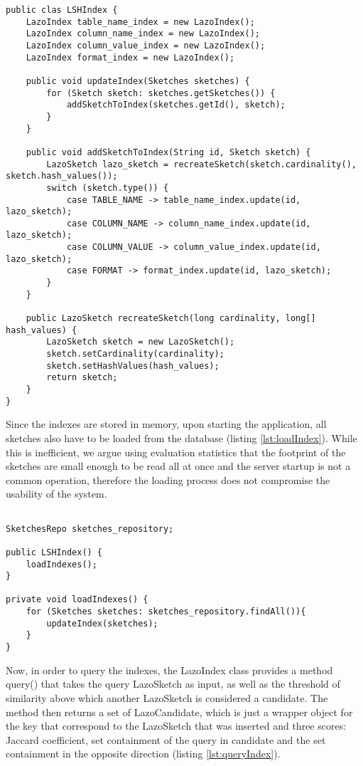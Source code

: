 \begin{lstlisting}[caption=Inserting sketches into the indexes, label=lst:updateIndex]
public clas LSHIndex {
    LazoIndex table_name_index = new LazoIndex();
    LazoIndex column_name_index = new LazoIndex();
    LazoIndex column_value_index = new LazoIndex();
    LazoIndex format_index = new LazoIndex();

    public void updateIndex(Sketches sketches) {
        for (Sketch sketch: sketches.getSketches()) {
            addSketchToIndex(sketches.getId(), sketch);
        }
    }

    public void addSketchToIndex(String id, Sketch sketch) {
        LazoSketch lazo_sketch = recreateSketch(sketch.cardinality(), sketch.hash_values());
        switch (sketch.type()) {
            case TABLE_NAME -> table_name_index.update(id, lazo_sketch);
            case COLUMN_NAME -> column_name_index.update(id, lazo_sketch);
            case COLUMN_VALUE -> column_value_index.update(id, lazo_sketch);
            case FORMAT -> format_index.update(id, lazo_sketch);
        }
    }

    public LazoSketch recreateSketch(long cardinality, long[] hash_values) {
        LazoSketch sketch = new LazoSketch();
        sketch.setCardinality(cardinality);
        sketch.setHashValues(hash_values);
        return sketch;
    }
}
\end{lstlisting}

Since the indexes are stored in memory, upon starting the application, all sketches also have to be loaded from the database (listing \ref{lst:loadIndex}). While this is inefficient, we argue using evaluation statistics that the footprint of the sketches are small enough to be read all at once and the server startup is not a common operation, therefore the loading process does not compromise the usability of the system.

\begin{lstlisting}[caption=Load all sketches into indexes during initialization, label=lst:loadIndex]

SketchesRepo sketches_repository;

public LSHIndex() {
    loadIndexes();
}

private void loadIndexes() {
    for (Sketches sketches: sketches_repository.findAll()){ 
        updateIndex(sketches);
    }
}
\end{lstlisting}

Now, in order to query the indexes, the LazoIndex class provides a method query() that takes the query LazoSketch as input, as well as the threshold of similarity above which another LazoSketch is considered a candidate. The method then returns a set of LazoCandidate, which is just a wrapper object for the key that correspond to the LazoSketch that was inserted and three scores: Jaccard coefficient, set containment of the query in candidate and the set containment in the opposite direction (listing \ref{lst:queryIndex}).


